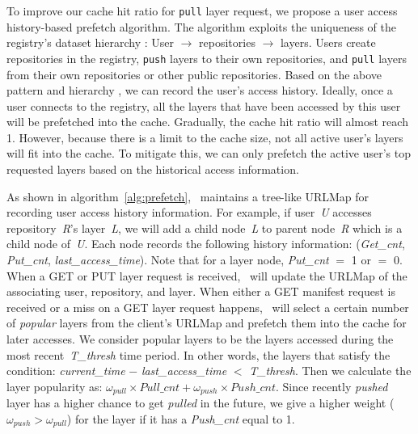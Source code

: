 To improve our cache hit ratio for \texttt{pull} layer request, we propose a user access history-based prefetch algorithm. The algorithm
exploits the uniqueness of the registry's 
dataset hierarchy
: User $\rightarrow$ repositories $\rightarrow$ layers.
Users create repositories in the registry, \texttt{push} layers to their own repositories,
and \texttt{pull} layers from their own repositories or other public repositories. 
Based on the above 
pattern and hierarchy 
, we can record the user's access history. 
Ideally, once a user connects to the registry, all the layers that have been accessed by this user will be prefetched into the cache.
Gradually, the cache hit ratio will almost reach 1.
However, because there is a limit to the cache size, %
not all active user's layers will fit into the cache.
To mitigate this, we can only prefetch the active user's top requested layers based on the historical access information.


As shown in algorithm~\ref{alg:prefetch}, \sysname~maintains a tree-like URLMap for recording 
user access history information. For example, if user~\emph{U} accesses repository~\emph{R}'s layer~\emph{L},
we will add a child node~\emph{L} to parent node~\emph{R} which is a child node of~\emph{U}.
Each node records the following history information: (\emph{Get\_cnt}, \emph{Put\_cnt}, \emph{last\_access\_time}). Note that for a layer node, \emph{Put\_cnt} $=$ 1 or $=$ 0.
When a GET or PUT layer request is received, \sysname~will update the URLMap of the associating user, repository, and layer. 
When either a GET manifest request is received or 
a miss on a GET layer request happens,
\sysname~will select a certain number of \emph{popular} layers from the client's 
URLMap
and prefetch them into the cache for later accesses.
We consider popular layers to be the layers accessed during the most recent~\emph{T\_thresh} 
time period. In other words, the layers that satisfy the condition:
\emph{current\_time} $-$ \emph{last\_access\_time} $<$ \emph{T\_thresh}.
Then we calculate the layer popularity as: 
$\omega_{pull} \times Pull\_cnt + \omega_{push} \times Push\_cnt$.
Since recently \emph{pushed} layer has a higher chance to get \emph{pulled} in the future,
we give a higher weight ($\omega_{push} > \omega_{pull}$) for the layer if it has a \emph{Push\_cnt} equal to 1. 

 

